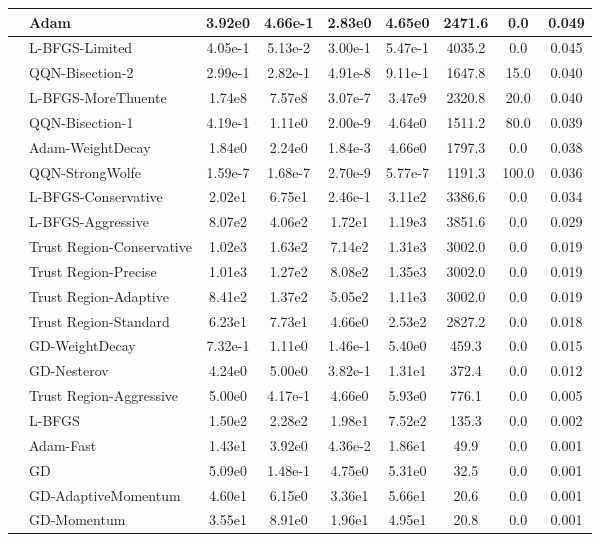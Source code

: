 \documentclass{article}
\begin{document}
\begin{longtable}{|l|l|c|c|c|c|c|c|c|}
\hline
 & Adam & 3.92e0 & 4.66e-1 & 2.83e0 & 4.65e0 & 2471.6 & 0.0 & 0.049 \\
\hline
 & L-BFGS-Limited & 4.05e-1 & 5.13e-2 & 3.00e-1 & 5.47e-1 & 4035.2 & 0.0 & 0.045 \\
\hline
 & QQN-Bisection-2 & 2.99e-1 & 2.82e-1 & 4.91e-8 & 9.11e-1 & 1647.8 & 15.0 & 0.040 \\
\hline
 & L-BFGS-MoreThuente & 1.74e8 & 7.57e8 & 3.07e-7 & 3.47e9 & 2320.8 & 20.0 & 0.040 \\
\hline
 & QQN-Bisection-1 & 4.19e-1 & 1.11e0 & 2.00e-9 & 4.64e0 & 1511.2 & 80.0 & 0.039 \\
\hline
 & Adam-WeightDecay & 1.84e0 & 2.24e0 & 1.84e-3 & 4.66e0 & 1797.3 & 0.0 & 0.038 \\
\hline
 & QQN-StrongWolfe & 1.59e-7 & 1.68e-7 & 2.70e-9 & 5.77e-7 & 1191.3 & 100.0 & 0.036 \\
\hline
 & L-BFGS-Conservative & 2.02e1 & 6.75e1 & 2.46e-1 & 3.11e2 & 3386.6 & 0.0 & 0.034 \\
\hline
 & L-BFGS-Aggressive & 8.07e2 & 4.06e2 & 1.72e1 & 1.19e3 & 3851.6 & 0.0 & 0.029 \\
\hline
 & Trust Region-Conservative & 1.02e3 & 1.63e2 & 7.14e2 & 1.31e3 & 3002.0 & 0.0 & 0.019 \\
\hline
 & Trust Region-Precise & 1.01e3 & 1.27e2 & 8.08e2 & 1.35e3 & 3002.0 & 0.0 & 0.019 \\
\hline
 & Trust Region-Adaptive & 8.41e2 & 1.37e2 & 5.05e2 & 1.11e3 & 3002.0 & 0.0 & 0.019 \\
\hline
 & Trust Region-Standard & 6.23e1 & 7.73e1 & 4.66e0 & 2.53e2 & 2827.2 & 0.0 & 0.018 \\
\hline
 & GD-WeightDecay & 7.32e-1 & 1.11e0 & 1.46e-1 & 5.40e0 & 459.3 & 0.0 & 0.015 \\
\hline
 & GD-Nesterov & 4.24e0 & 5.00e0 & 3.82e-1 & 1.31e1 & 372.4 & 0.0 & 0.012 \\
\hline
 & Trust Region-Aggressive & 5.00e0 & 4.17e-1 & 4.66e0 & 5.93e0 & 776.1 & 0.0 & 0.005 \\
\hline
 & L-BFGS & 1.50e2 & 2.28e2 & 1.98e1 & 7.52e2 & 135.3 & 0.0 & 0.002 \\
\hline
 & Adam-Fast & 1.43e1 & 3.92e0 & 4.36e-2 & 1.86e1 & 49.9 & 0.0 & 0.001 \\
\hline
 & GD & 5.09e0 & 1.48e-1 & 4.75e0 & 5.31e0 & 32.5 & 0.0 & 0.001 \\
\hline
 & GD-AdaptiveMomentum & 4.60e1 & 6.15e0 & 3.36e1 & 5.66e1 & 20.6 & 0.0 & 0.001 \\
\hline
 & GD-Momentum & 3.55e1 & 8.91e0 & 1.96e1 & 4.95e1 & 20.8 & 0.0 & 0.001 \\

\end{longtable}
\end{document}
